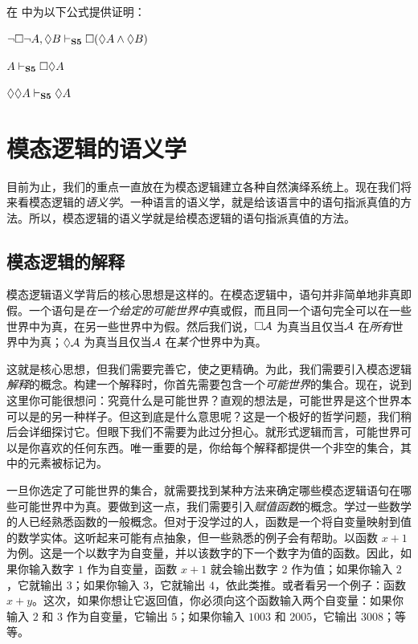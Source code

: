 \problempart
在 \mlSfive{} 中为以下公式提供证明：

\begin{compactlist}
	\item $\neg\Box\neg A, \Diamond B\vdash_{\mathbf{S5}} \Box(\Diamond A \wedge \Diamond B)$
	\item $A \vdash_{\mathbf{S5}}  \Box\Diamond A$
	\item $\Diamond\Diamond A\vdash_{\mathbf{S5}}  \Diamond A$
\end{compactlist}

\chapter{模态逻辑的语义学}
\label{Semantics}

目前为止，我们的重点一直放在为模态逻辑建立各种自然演绎系统上。现在我们将来看模态逻辑的\emph{语义学}。一种语言的语义学，就是给该语言中的语句指派真值的方法。所以，模态逻辑的语义学就是给模态逻辑的语句指派真值的方法。

\section{模态逻辑的解释}

模态逻辑语义学背后的核心思想是这样的。在模态逻辑中，语句并非简单地非真即假。一个语句是\emph{在一个给定的可能世界中}真或假，而且同一个语句完全可以在一些世界中为真，在另一些世界中为假。然后我们说，$\Box \mathcal{A}$ 为真当且仅当$\mathcal{A}$ 在\emph{所有}世界中为真；$\Diamond\mathcal{A}$ 为真当且仅当$\mathcal{A}$ 在\emph{某个}世界中为真。

这就是核心思想，但我们需要完善它，使之更精确。为此，我们需要引入模态逻辑\emph{解释}的概念。构建一个解释时，你首先需要包含一个\emph{可能世界}的集合。现在，说到这里你可能很想问：究竟什么是可能世界？直观的想法是，可能世界是这个世界本可以是的另一种样子。但这到底是什么意思呢？这是一个极好的哲学问题，我们稍后会详细探讨它。但眼下我们不需要为此过分担心。就形式逻辑而言，可能世界可以是你喜欢的任何东西。唯一重要的是，你给每个解释都提供一个非空的集合，其中的元素被标记为。

一旦你选定了可能世界的集合，就需要找到某种方法来确定哪些模态逻辑语句在哪些可能世界中为真。要做到这一点，我们需要引入\emph{赋值函数}的概念。学过一些数学的人已经熟悉函数的一般概念。但对于没学过的人，函数是一个将自变量映射到值的数学实体。这听起来可能有点抽象，但一些熟悉的例子会有帮助。以函数 $x+1$ 为例。这是一个以数字为自变量，并以该数字的下一个数字为值的函数。因此，如果你输入数字 $1$ 作为自变量，函数 $x+1$ 就会输出数字 $2$ 作为值；如果你输入 $2$，它就输出 $3$；如果你输入 $3$，它就输出 $4$，依此类推。或者看另一个例子：函数 $x+y$。这次，如果你想让它返回值，你必须向这个函数输入两个自变量：如果你输入 $2$ 和 $3$ 作为自变量，它输出 $5$；如果你输入 $1003$ 和 $2005$，它输出 $3008$；等等。

